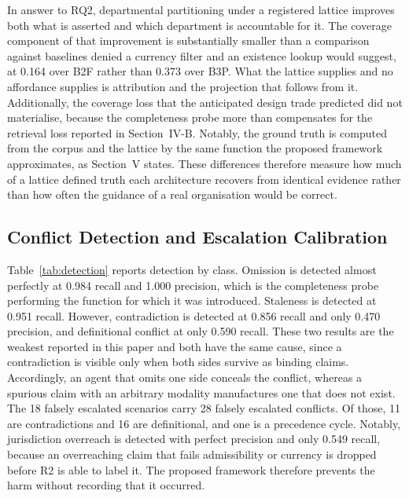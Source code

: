 \documentclass[journal]{IEEEtran}
\begin{document}
In answer to RQ2, departmental partitioning under a registered lattice improves both what is asserted and which department is accountable for it. The coverage component of that improvement is substantially smaller than a comparison against baselines denied a currency filter and an existence lookup would suggest, at 0.164 over B2F rather than 0.373 over B3P. What the lattice supplies and no affordance supplies is attribution and the projection that follows from it. Additionally, the coverage loss that the anticipated design trade predicted did not materialise, because the completeness probe more than compensates for the retrieval loss reported in Section~IV-B. Notably, the ground truth is computed from the corpus and the lattice by the same function the proposed framework approximates, as Section~V states. These differences therefore measure how much of a lattice defined truth each architecture recovers from identical evidence rather than how often the guidance of a real organisation would be correct.

\subsection{Conflict Detection and Escalation Calibration}

Table~\ref{tab:detection} reports detection by class. Omission is detected almost perfectly at 0.984 recall and 1.000 precision, which is the completeness probe performing the function for which it was introduced. Staleness is detected at 0.951 recall. However, contradiction is detected at 0.856 recall and only 0.470 precision, and definitional conflict at only 0.590 recall. These two results are the weakest reported in this paper and both have the same cause, since a contradiction is visible only when both sides survive as binding claims. Accordingly, an agent that omits one side conceals the conflict, whereas a spurious claim with an arbitrary modality manufactures one that does not exist. The 18 falsely escalated scenarios carry 28 falsely escalated conflicts. Of those, 11 are contradictions and 16 are definitional, and one is a precedence cycle. Notably, jurisdiction overreach is detected with perfect precision and only 0.549 recall, because an overreaching claim that fails admissibility or currency is dropped before R2 is able to label it. The proposed framework therefore prevents the harm without recording that it occurred.
\end{document}
